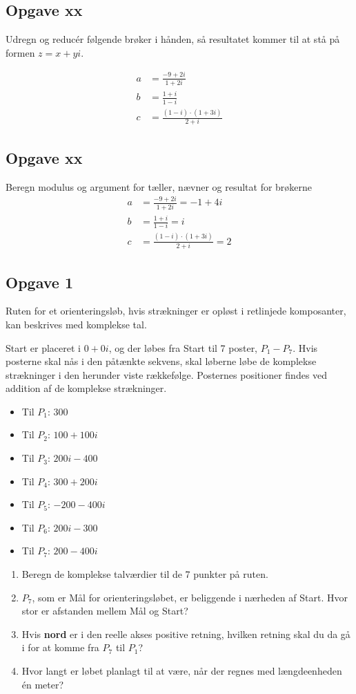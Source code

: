 \documentclass[a4paper, 12pt,titlepage]{article}
\begin{document}
\subsection{Opgave xx}
\label{sec:org6a8e3ac}
Udregn og reducér følgende brøker i hånden, så resultatet kommer til at stå på formen \(z=x+yi\).

\begin{align*}
a &=\frac{-9+2i}{1+2i} \\
b &=\frac{1+i}{1-i} \\
c &= \frac{(1-i)\cdot (1+3i)}{2+i}
\end{align*}

\subsection{Opgave xx}
\label{sec:orgb3a2878}
Beregn modulus og argument for  tæller, nævner og resultat for brøkerne
\begin{align*}
a &=\frac{-9+2i}{1+2i} =-1 + 4i  \\
b &=\frac{1+i}{1-i} = i  \\
c &= \frac{(1-i)\cdot (1+3i)}{2+i} = 2
\end{align*}
\subsection*{Opgave 1}
\label{sec:org480cdac}
Ruten for et orienteringsløb, hvis strækninger er opløst i retlinjede komposanter, kan beskrives med komplekse tal.

Start er placeret i \(0+0i\), og der løbes fra Start til 7 poster, \(P_1-P_7\). Hvis posterne skal nås i den påtænkte sekvens, skal løberne løbe de komplekse strækninger i den herunder viste rækkefølge. Posternes positioner findes ved addition af de komplekse strækninger.

\begin{itemize}
\item Til \(P_1\): \(300\)
\item Til \(P_2\): \(100 + 100i\)
\item Til \(P_3\): \(200i-400\)
\item Til \(P_4\): \(300 + 200i\)
\item Til \(P_5\): \(-200 - 400i\)
\item Til \(P_6\): \(200i - 300\)
\item Til \(P_7\): \(200 - 400i\)
\end{itemize}


\begin{enumerate}
\item Beregn de komplekse talværdier til de 7 punkter på ruten.
\item \(P_7\), som er Mål for orienteringsløbet, er beliggende i nærheden af Start. Hvor stor er afstanden mellem Mål og Start?
\item Hvis \textbf{nord} er i den reelle akses positive retning, hvilken retning skal du da gå i for at komme fra \(P_7\) til \(P_1\)?
\item Hvor langt er løbet planlagt til at være, når der regnes med længdeenheden én meter?
\end{enumerate}
\end{document}
